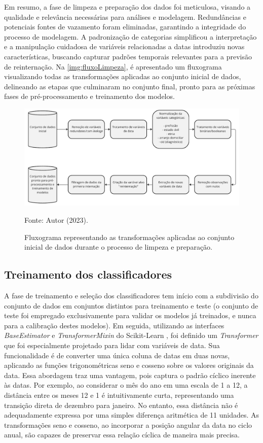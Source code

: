 Em resumo, a fase de limpeza e preparação dos dados foi meticulosa, visando a qualidade e relevância necessárias para análises e modelagem. Redundâncias e potenciais fontes de vazamento foram eliminadas, garantindo a integridade do processo de modelagem. A padronização de categorias simplificou a interpretação e a manipulação cuidadosa de variáveis relacionadas a datas introduziu novas características, buscando capturar padrões temporais relevantes para a previsão de reinternação. Na \autoref{img:fluxoLimpeza}, é apresentado um fluxograma visualizando todas as transformações aplicadas ao conjunto inicial de dados, delineando as etapas que culminaram no conjunto final, pronto para as próximas fases de pré-processamento e treinamento dos modelos.

\begin{figure}
	\centering
	\caption{\label{img:fluxoLimpeza}Fluxograma representando as transformações aplicadas ao conjunto inicial de dados durante o processo de limpeza e preparação.}
	\includegraphics[scale=0.7]{USPSC-img/fluxo-limpeza.pdf}
	\begin{center}
		Fonte: Autor (2023).
	\end{center}
\end{figure}

\subsection{Treinamento dos classificadores}

A fase de treinamento e seleção dos classificadores tem início com a subdivisão do conjunto de dados em conjuntos distintos para treinamento e teste (o conjunto de teste foi empregado exclusivamente para validar os modelos já treinados, e nunca para a calibração destes modelos). Em seguida, utilizando as interfaces \textit{BaseEstimator} e \textit{TransformerMixin} do Scikit-Learn \cite{Buitinck}, foi definido um \textit{Transformer} que foi especialmente projetado para lidar com variáveis de data. Sua funcionalidade é de converter uma única coluna de datas em duas novas, aplicando as funções trigonométricas seno e cosseno sobre os valores originais da data. Essa abordagem traz uma vantagem, pois captura o padrão cíclico inerente às datas. Por exemplo, ao considerar o mês do ano em uma escala de 1 a 12, a distância entre os meses 12 e 1 é intuitivamente curta, representando uma transição direta de dezembro para janeiro. No entanto, essa distância não é adequadamente expressa por uma simples diferença aritmética de 11 unidades. As transformações seno e cosseno, ao incorporar a posição angular da data no ciclo anual, são capazes de preservar essa relação cíclica de maneira mais precisa.

